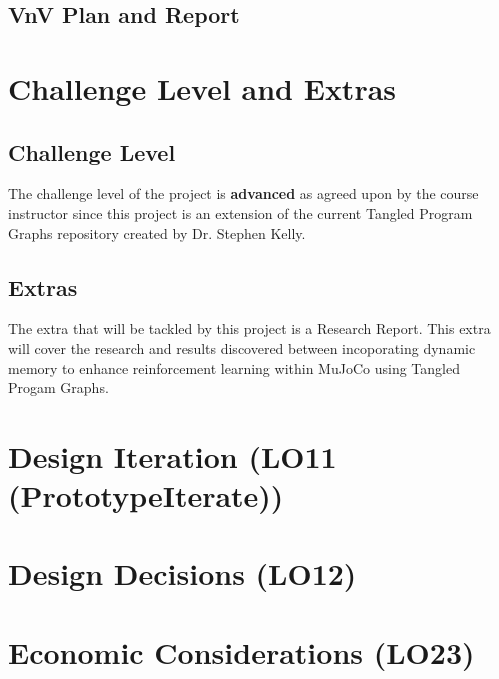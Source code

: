 \documentclass{article}
\begin{document}
\subsection{VnV Plan and Report}

\section{Challenge Level and Extras}

\subsection{Challenge Level}
The challenge level of the project is \textbf{advanced} as agreed upon by the course instructor since this project is an extension of the current Tangled Program Graphs repository created by Dr. Stephen Kelly.

\subsection{Extras}
The extra that will be tackled by this project is a Research Report. This extra will cover the research and results discovered between incoporating dynamic memory to enhance reinforcement learning within MuJoCo using Tangled Progam Graphs.

\section{Design Iteration (LO11 (PrototypeIterate))}



\section{Design Decisions (LO12)}


\section{Economic Considerations (LO23)}
\end{document}
